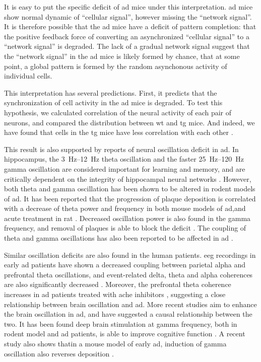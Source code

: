 It is easy to put the specific deficit of \gls{ad} mice under this interpretation. \gls{ad} mice show normal dynamic of ``cellular signal'', however missing the ``network signal''. It is therefore possible that the \gls{ad} mice have a deficit of pattern completion: that the positive feedback force of converting an asynchronized ``cellular signal'' to a ``network signal'' is degraded. The lack of a gradual network signal suggest that the ``network signal'' in the \gls{ad} mice is likely formed by chance, that at some point, a global pattern is formed by the random asynchonous activity of individual cells. 

This interpretation has several predictions. First, it predicts that the synchronization of cell activity in the \gls{ad} mice is degraded. To test this hypothesis, we calculated correlation of the neural activity of each pair of neurons, and compared the distribution between \gls{wt} and \gls{tg} mice. And indeed, we have found that cells in the \gls{tg} mice have less correlation with each other . 

This result is also supported by reports of neural oscillation deficit in \gls{ad}. In hippocampus, the \SIrange{3}{12}{\hertz} theta oscillation and the faster \SIrange{25}{120}{\hertz} gamma oscillation are considered important for learning and memory, and are critically dependent on the integrity of hippocampal neural networks \citep{buzsaki02, colgin09}. However, both theta and gamma oscillation has been shown to be altered in rodent models of \gls{ad}. It has been reported that the progression of plaque deposition is correlated with a decrease of theta power and frequency in both mouse models of \gls{ad},and acute \abeta{} treatment in rat \citep{scott12, villette10}. Decreased oscillation power is also found in the gamma frequency, and removal of \abeta{} plaques is able to block the deficit \citep{driver07, kurudenkandy14}. The coupling of theta and gamma oscillations has also been reported to be affected in \gls{ad} \citep{goutagny13}. 

Similar oscillation deficits are also found in the human patients. \Gls{eeg} recordings in early \gls{ad} patients have shown a decreased coupling between parietal alpha and prefrontal theta oscillations, and event-related delta, theta and alpha coherences are also significantly decreased \citep{guntekin08, montez09}. Moreover, the prefrontal theta coherence increases in \gls{ad} patients treated with \gls{ache} inhibitors \citep{yener07}, suggesting a close relationship between brain oscillation and \gls{ad}. More recent studies aim to enhance the brain oscillation in \gls{ad}, and have suggested a causal relationship between the two. It has been found deep brain stimulation at gamma frequency, both in rodent model and \gls{ad} patients, is able to improve cognitive function \citep{suthana14}. A recent study also shows thatin a mouse model of early \gls{ad}, induction of gamma oscillation also reverses \abeta{} deposition \citep{iaccarino16}. 

